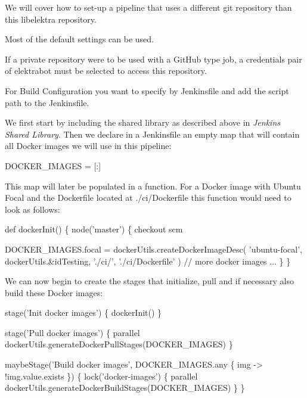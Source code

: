We will cover how to set-\/up a pipeline that uses a different git repository than this {\ttfamily libelektra} repository.

Most of the default settings can be used.


\begin{DoxyItemize}
\item If a private repository were to be used with a Git\+Hub type job, a credentials pair of {\ttfamily elektrabot} must be selected to access this repository.
\item For Build Configuration you want to specify {\ttfamily by Jenkinsfile} and add the script path to the Jenkinsfile.
\end{DoxyItemize}

We first start by including the shared library as described above in {\itshape Jenkins Shared Library}. Then we declare in a Jenkinsfile an empty map that will contain all Docker images we will use in this pipeline\+:


\begin{DoxyCode}
DOCKER\_IMAGES = [:]
\end{DoxyCode}


This map will later be populated in a function. For a Docker image with Ubuntu Focal and the Dockerfile located at {\ttfamily ./ci/\+Dockerfile} this function would need to look as follows\+:


\begin{DoxyCode}
def dockerInit() \{
  node('master') \{
    checkout scm

    DOCKER\_IMAGES.focal = dockerUtils.createDockerImageDesc(
      'ubuntu-focal', dockerUtils.&idTesting,
      './ci/',
      './ci/Dockerfile'
    )
    // more docker images ...
  \}
\}
\end{DoxyCode}


We can now begin to create the stages that initialize, pull and if necessary also build these Docker images\+:


\begin{DoxyCode}
stage('Init docker images') \{
  dockerInit()
\}

stage('Pull docker images') \{
  parallel dockerUtils.generateDockerPullStages(DOCKER\_IMAGES)
\}

maybeStage('Build docker images', DOCKER\_IMAGES.any \{ img -> !img.value.exists \}) \{
  lock('docker-images') \{
        parallel dockerUtils.generateDockerBuildStages(DOCKER\_IMAGES)
  \}
\}
\end{DoxyCode}


